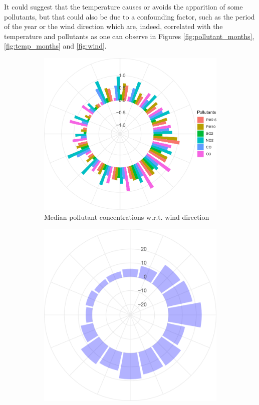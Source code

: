 \documentclass[a4paper, 12pt]{article}
\begin{document}
    It could suggest that the temperature causes or avoids the apparition of some pollutants, but that could also be due to a confounding factor, such as the period of the year or the wind direction which are, indeed, correlated with the temperature and pollutants as one can observe in Figures \ref{fig:pollutant_months}, \ref{fig:temp_months} and \ref{fig:wind}. \par
    \begin{figure}[h]
        \begin{subfigure}{.48\textwidth}
          \centering
          \includegraphics[height=0.9\textwidth]{resources/pdf/medianpollutants_wdir.pdf}
          \caption{Median pollutant concentrations w.r.t. wind direction}
          \label{fig:pollutants_wdir}
        \end{subfigure}
        \hspace{0.5em}
        \begin{subfigure}{.48\textwidth}
          \centering
          \includegraphics[height=0.9\textwidth]{resources/pdf/mediantemp_wdir.pdf}

\end{subfigure}
\end{figure}
\end{document}
